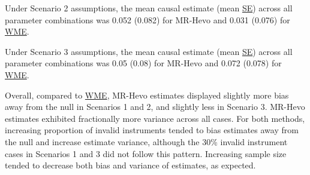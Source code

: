 \documentclass[
]{article}
\begin{document}
Under Scenario 2 assumptions, the mean causal estimate (mean \hyperref[acronyms_SE]{SE}) across all parameter combinations was 0.052 (0.082) for MR-Hevo and 0.031 (0.076) for \hyperref[acronyms_WME]{WME}.

Under Scenario 3 assumptions, the mean causal estimate (mean \hyperref[acronyms_SE]{SE}) across all parameter combinations was 0.05 (0.08) for MR-Hevo and 0.072 (0.078) for \hyperref[acronyms_WME]{WME}.

Overall, compared to \hyperref[acronyms_WME]{WME}, MR-Hevo estimates displayed slightly more bias away from the null in Scenarios 1 and 2, and slightly less in Scenario 3. MR-Hevo estimates exhibited fractionally more variance across all cases. For both methods, increasing proportion of invalid instruments tended to bias estimates away from the null and increase estimate variance, although the 30\% invalid instrument cases in Scenarios 1 and 3 did not follow this pattern. Increasing sample size tended to decrease both bias and variance of estimates, as expected.
\end{document}
